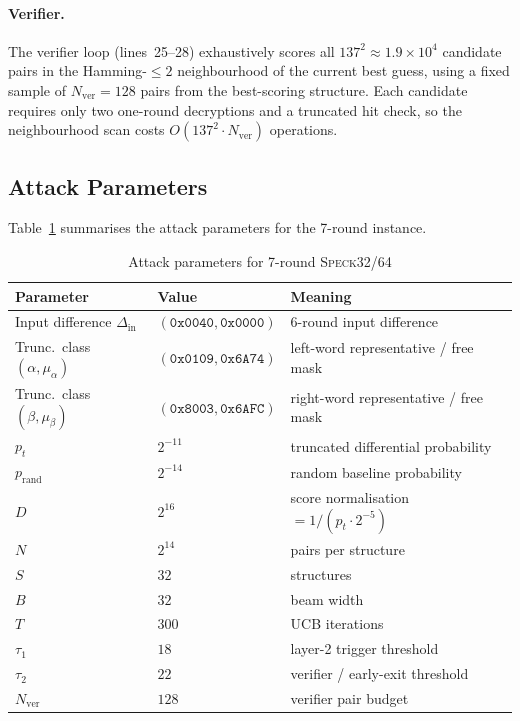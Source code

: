 \documentclass[runningheads]{llncs}
\newcommand{\speck}{\textsc{Speck}32/64}
\begin{document}
\paragraph{Verifier.}
The verifier loop (lines~25--28) exhaustively scores all $137^2 \approx
1.9 \times 10^4$ candidate pairs in the Hamming-$\le 2$ neighbourhood
of the current best guess, using a fixed sample of $N_{\mathrm{ver}} = 128$
pairs from the best-scoring structure.  Each candidate requires only
two one-round decryptions and a truncated hit check, so the
neighbourhood scan costs $O(137^2 \cdot N_{\mathrm{ver}})$ operations.

\subsection{Attack Parameters}
\label{subsec:params}

Table~\ref{tab:params} summarises the attack parameters for the
7-round instance.

\begin{table}[h]
\centering
\caption{Attack parameters for 7-round \speck{}}
\label{tab:params}
\begin{tabular}{lll}
\toprule
\textbf{Parameter} & \textbf{Value} & \textbf{Meaning} \\
\midrule
Input difference $\Delta_{\mathrm{in}}$ & $(\mathtt{0x0040}, \mathtt{0x0000})$ &
  6-round input difference \\
Trunc.\ class $(\alpha, \mu_\alpha)$ & $(\mathtt{0x0109}, \mathtt{0x6A74})$ &
  left-word representative / free mask \\
Trunc.\ class $(\beta, \mu_\beta)$   & $(\mathtt{0x8003}, \mathtt{0x6AFC})$ &
  right-word representative / free mask \\
$p_t$ & $2^{-11}$ & truncated differential probability \\
$p_{\mathrm{rand}}$ & $2^{-14}$ & random baseline probability \\
$D$ & $2^{16}$ & score normalisation $= 1/(p_t \cdot 2^{-5})$ \\
$N$ & $2^{14}$ & pairs per structure \\
$S$ & $32$ & structures \\
$B$ & $32$ & beam width \\
$T$ & $300$ & UCB iterations \\
$\tau_1$ & $18$ & layer-2 trigger threshold \\
$\tau_2$ & $22$ & verifier / early-exit threshold \\
$N_{\mathrm{ver}}$ & $128$ & verifier pair budget \\
\bottomrule
\end{tabular}
\end{table}
\end{document}
